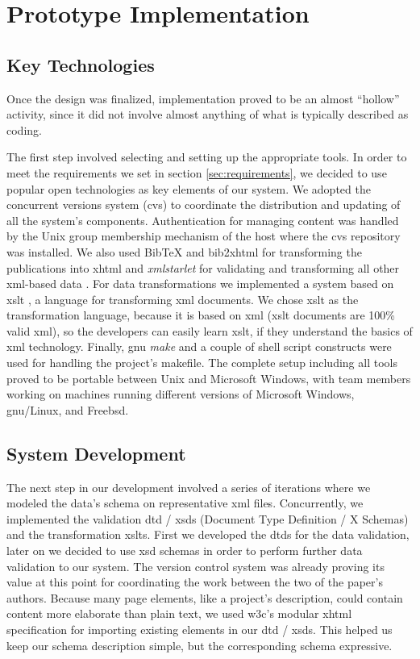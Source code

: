 \documentclass{elsart}
\begin{document}
\section{Prototype Implementation}

\subsection{Key Technologies}
\label{subsec:key-tech}

Once the design was finalized,
implementation proved to be an almost ``hollow'' activity,
since it did not involve almost anything of what
is typically described as coding.

The first step involved selecting and setting up the
appropriate tools. In order to meet the requirements we set in section \ref{sec:requirements}, 
we decided to use popular open
technologies as key elements of our system.
We adopted the concurrent versions system
({\sc cvs}) \cite{BF01} to coordinate the distribution
and updating of all the system's components.
Authentication for managing content was handled by the
Unix group membership mechanism of the host where the
{\sc cvs} repository was installed.
We also used
{\sc BibTeX} \cite{Pa88,Lam94} and {\sc bib2xhtml} \cite{BibXHMTL} for transforming the publications
into {\sc xhtml} and
\textit{xmlstarlet} \cite{Gru04} for validating and transforming
all other {\sc xml}-based data \cite{W3C_XML}.
For data transformations we 
implemented a system based on {\sc xslt} \cite{W3C_XSLT}, a language for transforming {\sc xml} documents.
We chose {\sc xslt} as the transformation language, because it is based on {\sc xml} ({\sc xslt} documents are 100\% valid {\sc xml}), so the
developers can easily learn {\sc xslt}, if they understand the basics of {\sc xml} technology.
Finally, {\sc gnu} {\em make} \cite{gnu_make} and a couple of shell script
constructs were used for handling the project's makefile.
The complete setup including all tools proved to be portable
between Unix and Microsoft Windows, with team members working
on machines running different versions of Microsoft Windows, {\sc gnu}/Linux,
and Free{\sc bsd}.

\subsection{System Development}

The next step in our development involved a series of iterations where we
modeled the data's schema on representative {\sc xml}
files. Concurrently, we implemented the validation {\sc dtd / xsd}s (Document Type Definition / X Schemas)
and the transformation {\sc xslt}s. First we developed the {\sc dtd}s
for the data validation, later on we decided to use {\sc xsd} schemas in order to perform
further data validation to our system.
The version control system was already proving its value
at this point
for coordinating the work between the two of the paper's authors.
Because many page elements, like a project's description,
could contain content more elaborate than plain text,
we used {\sc w3c}'s modular {\sc xhtml} specification for
importing existing elements in our {\sc dtd / xsd}s.
This helped us keep our schema description simple,
but the corresponding schema expressive.
\end{document}
